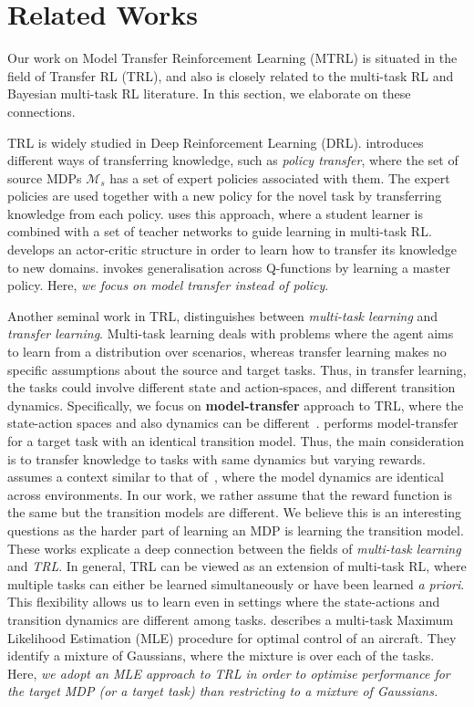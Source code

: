 \section{Related Works}\label{sec:related}
Our work on Model Transfer Reinforcement Learning (MTRL) is situated in the field of Transfer RL (TRL), and also is closely related to the multi-task RL and Bayesian multi-task RL literature. In this section, we elaborate on these connections.

TRL is widely studied in Deep Reinforcement Learning (DRL). \citep{zhu2020transfer} introduces different ways of transferring knowledge, such as \emph{policy transfer}, where the set of source MDPs $\mathcal{M}_s$ has a set of expert policies associated with them. The expert policies are used together with a new policy for the novel task by transferring knowledge from each policy. \citep{rusu2015policy} uses this approach, where a student learner is combined with a set of teacher networks to guide learning in multi-task RL. \citep{parisotto2015actor} develops an actor-critic structure in order to learn how to transfer its knowledge to new domains.   \citep{arnekvist2019vpe} invokes generalisation across Q-functions by learning a master policy. Here,\textit{ we focus on model transfer instead of policy}.

Another seminal work in TRL, \citep{taylor2009transfer} distinguishes between \emph{multi-task learning} and \emph{transfer learning}. Multi-task learning deals with problems where the agent aims to learn from a distribution over scenarios, whereas transfer learning makes no specific assumptions about the source and target tasks. Thus, in transfer learning, the tasks could involve different state and action-spaces, and different transition dynamics. Specifically, we focus on \textbf{model-transfer} approach to TRL, where the state-action spaces and also dynamics can be different~\citep{atkeson1997comparison}. \citep{atkeson1997comparison} performs model-transfer for a target task with an identical transition model. Thus, the main consideration is to transfer knowledge to tasks with same dynamics but varying rewards. \citep{laroche2017transfer} assumes a context similar to that of~\citep{atkeson1997comparison}, where the model dynamics are identical across environments. In our work, we rather assume that the reward function is the same but the transition models are different. We believe this is an interesting questions as the harder part of learning an MDP is learning the transition model. 
These works explicate a deep connection between the fields of \emph{multi-task learning} and \emph{TRL}. In general, TRL can be viewed as an extension of multi-task RL, where multiple tasks can either be learned simultaneously or have been learned \textit{a priori}. This flexibility allows us to learn even in settings where the state-actions and transition dynamics are different among tasks. \citep{rommel2017aircraft} describes a multi-task Maximum Likelihood Estimation (MLE) procedure for optimal control of an aircraft. They identify a mixture of Gaussians, where the mixture is over each of the tasks. Here, \textit{we adopt an MLE approach to TRL in order to optimise performance for the target MDP (or a target task) than restricting to a mixture of Gaussians.}

